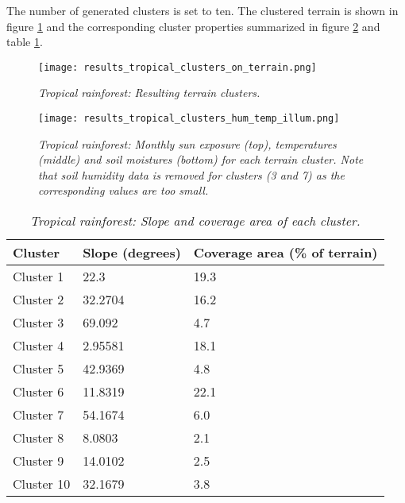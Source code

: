 The number of generated clusters is set to ten. The clustered terrain is shown in figure \ref{fig:results_tropical_terrain_clusters} and the corresponding cluster properties summarized in figure \ref{fig:results_tropical_cluster_hum_temp_illum} and table \ref{tab:results_tropical_cluster_slope_covarea}. 

\begin{figure}[htb!]
\center
	\texttt{[image: results\_tropical\_clusters\_on\_terrain.png]}
	\caption{ \textit{Tropical rainforest: Resulting terrain clusters.} }
	\label{fig:results_tropical_terrain_clusters}
\end{figure}

\begin{figure}[htb!]
\center
	\texttt{[image: results\_tropical\_clusters\_hum\_temp\_illum.png]}
	\caption{ \textit{Tropical rainforest: Monthly sun exposure (top), temperatures (middle) and soil moistures (bottom) for each terrain cluster. Note that soil humidity data is removed for clusters (3 and 7) as the corresponding values are too small.}}
	\label{fig:results_tropical_cluster_hum_temp_illum}
\end{figure}

\begin{table}[htb!]
  \centering
	    \begin{tabular}{|p{5cm}|p{5cm}|p{5cm}|}
		\hline	
  	    \textbf{Cluster} & \textbf{Slope (degrees)} & \textbf{Coverage area (\% of terrain)} \\
  	    \hline	
		Cluster 1 & 22.3 & 19.3 \\
		\hline
		Cluster 2 & 32.2704 & 16.2 \\
		\hline
		Cluster 3 & 69.092 & 4.7 \\
		\hline
		Cluster 4 & 2.95581 & 18.1 \\
		\hline
		Cluster 5 & 42.9369 & 4.8 \\
		\hline
		Cluster 6 & 11.8319 & 22.1 \\
		\hline
		Cluster 7 & 54.1674 & 6.0 \\
		\hline
		Cluster 8 & 8.0803 & 2.1 \\
		\hline
		Cluster 9 & 14.0102 & 2.5 \\
		\hline
		Cluster 10 & 32.1679 & 3.8 \\
		\hline
		\end{tabular}
		\caption{\textit{Tropical rainforest: Slope and coverage area of each cluster.}}
	  \label{tab:results_tropical_cluster_slope_covarea}
\end{table}

